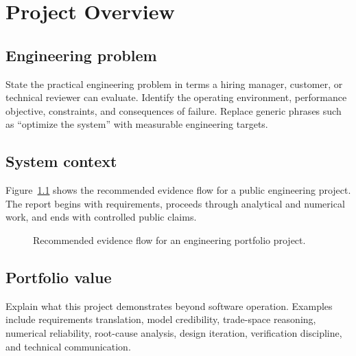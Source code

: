 \chapter{Project Overview}

\section{Engineering problem}
State the practical engineering problem in terms a hiring manager, customer, or
technical reviewer can evaluate. Identify the operating environment, performance
objective, constraints, and consequences of failure. Replace generic phrases such as
``optimize the system'' with measurable engineering targets.

\section{System context}
Figure~\ref{fig:portfolio-workflow} shows the recommended evidence flow for a public
engineering project. The report begins with requirements, proceeds through analytical
and numerical work, and ends with controlled public claims.

\begin{figure}[H]
\centering
{}
\caption{Recommended evidence flow for an engineering portfolio project.}
\label{fig:portfolio-workflow}
\end{figure}

\section{Portfolio value}
Explain what this project demonstrates beyond software operation. Examples include
requirements translation, model credibility, trade-space reasoning, numerical
reliability, root-cause analysis, design iteration, verification discipline, and
technical communication.
